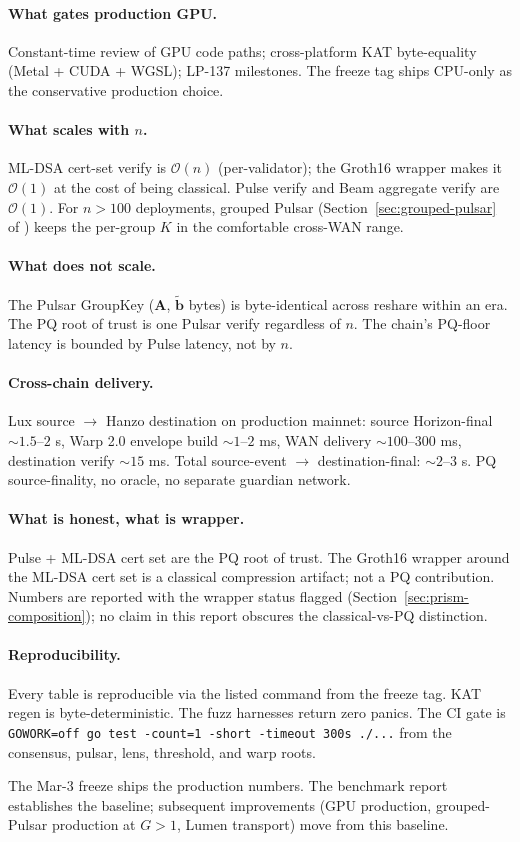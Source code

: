 \paragraph{What gates production GPU.} Constant-time review of GPU code paths; cross-platform KAT byte-equality (Metal + CUDA + WGSL); LP-137 \cite{lp137} milestones. The freeze tag ships CPU-only as the conservative production choice.

\paragraph{What scales with $n$.} ML-DSA cert-set verify is $\mathcal{O}(n)$ (per-validator); the Groth16 wrapper makes it $\mathcal{O}(1)$ at the cost of being classical. Pulse verify and Beam aggregate verify are $\mathcal{O}(1)$. For $n > 100$ deployments, grouped Pulsar (Section~\ref{sec:grouped-pulsar} of \cite{luxquasarhorizon}) keeps the per-group $K$ in the comfortable cross-WAN range.

\paragraph{What does not scale.} The Pulsar GroupKey ($\mathbf{A}$, $\tilde{\mathbf{b}}$ bytes) is byte-identical across reshare within an era. The PQ root of trust is one Pulsar verify regardless of $n$. The chain's PQ-floor latency is bounded by Pulse latency, not by $n$.

\paragraph{Cross-chain delivery.} Lux source $\to$ Hanzo destination on production mainnet: source Horizon-final $\sim 1.5$--$2$ s, Warp 2.0 envelope build $\sim 1$--$2$ ms, WAN delivery $\sim 100$--$300$ ms, destination verify $\sim 15$ ms. Total source-event $\to$ destination-final: $\sim 2$--$3$ s. PQ source-finality, no oracle, no separate guardian network.

\paragraph{What is honest, what is wrapper.} Pulse + ML-DSA cert set are the PQ root of trust. The Groth16 wrapper around the ML-DSA cert set is a classical compression artifact; not a PQ contribution. Numbers are reported with the wrapper status flagged (Section~\ref{sec:prism-composition}); no claim in this report obscures the classical-vs-PQ distinction.

\paragraph{Reproducibility.} Every table is reproducible via the listed command from the freeze tag. KAT regen is byte-deterministic. The fuzz harnesses return zero panics. The CI gate is \texttt{GOWORK=off go test -count=1 -short -timeout 300s ./...} from the consensus, pulsar, lens, threshold, and warp roots.

The Mar-3 freeze ships the production numbers. The benchmark report establishes the baseline; subsequent improvements (GPU production, grouped-Pulsar production at $G > 1$, Lumen transport) move from this baseline.
